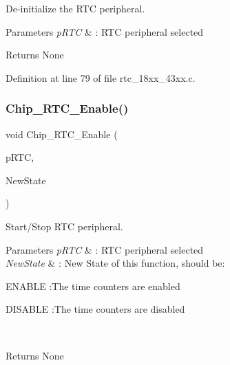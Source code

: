 De-\/initialize the R\+TC peripheral. 


\begin{DoxyParams}{Parameters}
{\em p\+R\+TC} & \+: R\+TC peripheral selected \\
\hline
\end{DoxyParams}
\begin{DoxyReturn}{Returns}
None 
\end{DoxyReturn}


Definition at line 79 of file rtc\+\_\+18xx\+\_\+43xx.\+c.

\mbox{\label{group___r_t_c__18_x_x__43_x_x_gaad05032c6d6c4bc5ea9e02311cdc9a18}} 
\subsubsection{\texorpdfstring{Chip\+\_\+\+R\+T\+C\+\_\+\+Enable()}{Chip\_RTC\_Enable()}}
{\footnotesize\ttfamily void Chip\+\_\+\+R\+T\+C\+\_\+\+Enable (\begin{DoxyParamCaption}\item[{\hyperlink{struct_l_p_c___r_t_c___t}{L\+P\+C\+\_\+\+R\+T\+C\+\_\+T} $\ast$}]{p\+R\+TC,  }\item[{\hyperlink{group___l_p_c___types___public___types_gac9a7e9a35d2513ec15c3b537aaa4fba1}{Functional\+State}}]{New\+State }\end{DoxyParamCaption})}



Start/\+Stop R\+TC peripheral. 


\begin{DoxyParams}{Parameters}
{\em p\+R\+TC} & \+: R\+TC peripheral selected \\
\hline
{\em New\+State} & \+: New State of this function, should be\+:
\begin{DoxyItemize}
\item E\+N\+A\+B\+LE \+:The time counters are enabled
\item D\+I\+S\+A\+B\+LE \+:The time counters are disabled 
\end{DoxyItemize}\\
\hline
\end{DoxyParams}
\begin{DoxyReturn}{Returns}
None 
\end{DoxyReturn}


